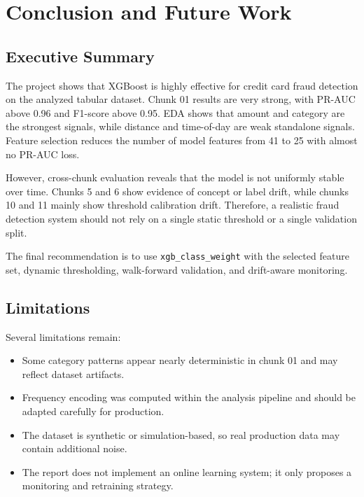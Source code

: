 \documentclass[12pt,a4paper,twoside]{article}
\begin{document}
\clearpage
\section{Conclusion and Future Work}

\subsection{Executive Summary}

The project shows that XGBoost is highly effective for credit card fraud detection on the analyzed tabular dataset. Chunk 01 results are very strong, with PR-AUC above 0.96 and F1-score above 0.95. EDA shows that amount and category are the strongest signals, while distance and time-of-day are weak standalone signals. Feature selection reduces the number of model features from 41 to 25 with almost no PR-AUC loss.

However, cross-chunk evaluation reveals that the model is not uniformly stable over time. Chunks 5 and 6 show evidence of concept or label drift, while chunks 10 and 11 mainly show threshold calibration drift. Therefore, a realistic fraud detection system should not rely on a single static threshold or a single validation split.

The final recommendation is to use \texttt{xgb\_class\_weight} with the selected feature set, dynamic thresholding, walk-forward validation, and drift-aware monitoring.

\subsection{Limitations}

Several limitations remain:
\begin{itemize}
    \item Some category patterns appear nearly deterministic in chunk 01 and may reflect dataset artifacts.
    \item Frequency encoding was computed within the analysis pipeline and should be adapted carefully for production.
    \item The dataset is synthetic or simulation-based, so real production data may contain additional noise.
    \item The report does not implement an online learning system; it only proposes a monitoring and retraining strategy.
\end{itemize}
\end{document}
